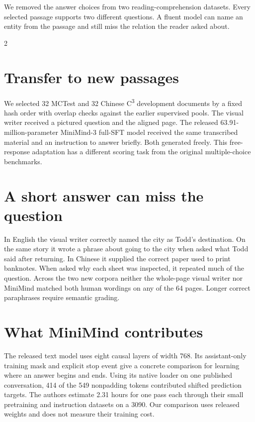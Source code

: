 \newpage
{}
\noindent We removed the answer choices from two reading-comprehension datasets. Every selected passage supports two different questions. A fluent model can name an entity from the passage and still miss the relation the reader asked about.
\begin{multicols}{2}
\section*{Transfer to new passages}
We selected 32 MCTest and 32 Chinese C\textsuperscript{3} development documents by a fixed hash order with overlap checks against the earlier supervised pools. The visual writer received a pictured question and the aligned page. The released 63.91-million-parameter MiniMind-3 full-SFT model received the same transcribed material and an instruction to answer briefly. Both generated freely. This free-response adaptation has a different scoring task from the original multiple-choice benchmarks.
\section*{A short answer can miss the question}
In English the visual writer correctly named the city as Todd's destination. On the same story it wrote a phrase about going to the city when asked what Todd said after returning. In Chinese it supplied the correct paper used to print banknotes. When asked why each sheet was inspected, it repeated much of the question. Across the two new corpora neither the whole-page visual writer nor MiniMind matched both human wordings on any of the 64 pages. Longer correct paraphrases require semantic grading.
\section*{What MiniMind contributes}
The released text model uses eight causal layers of width 768. Its assistant-only training mask and explicit stop event give a concrete comparison for learning where an answer begins and ends. Using its native loader on one published conversation, 414 of the 549 nonpadding tokens contributed shifted prediction targets. The authors estimate 2.31 hours for one pass each through their small pretraining and instruction datasets on a 3090. Our comparison uses released weights and does not measure their training cost.
\end{multicols}
